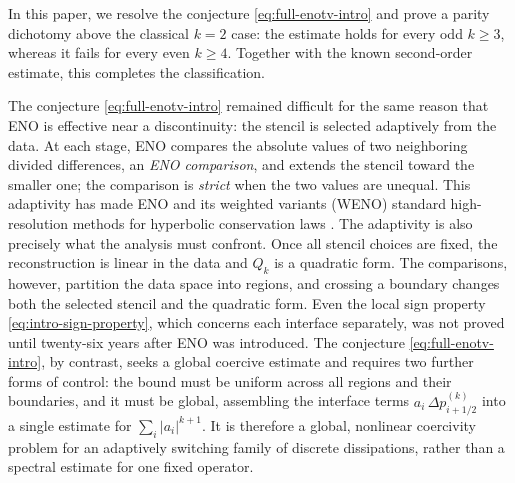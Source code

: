 \documentclass[11pt]{amsart}
\theoremstyle{plain}
\theoremstyle{definition}
\theoremstyle{remark}
\numberwithin{equation}{section}
\theoremstyle{plain}
\begin{document}
In this paper, we resolve the conjecture \eqref{eq:full-enotv-intro}
and prove a parity dichotomy above the classical $k=2$ case: the
estimate holds for every odd $k\ge3$, whereas it fails for every even
$k\ge4$.  Together with the known second-order estimate, this
completes the classification.


The conjecture \eqref{eq:full-enotv-intro} remained difficult for the same reason that ENO is
effective near a discontinuity: the stencil is selected adaptively
from the data.  At each stage, ENO compares the absolute values of two
neighboring divided differences, an \emph{ENO comparison}, and extends
the stencil toward the smaller one; the comparison is \emph{strict}
when the two values are unequal.  This adaptivity has made ENO and its
weighted variants (WENO) standard high-resolution methods for
hyperbolic conservation laws \cite{LiuOsherChan,JiangShu,Shu}. The adaptivity is
also precisely what the analysis must confront.  Once all stencil
choices are fixed, the reconstruction is linear in the data and $Q_k$
is a quadratic form.  The comparisons, however, partition the data
space into regions, and crossing a boundary changes both the selected
stencil and the quadratic form.  
Even the local sign property
\eqref{eq:intro-sign-property}, which concerns each interface
separately, was not proved until twenty-six years after ENO was
introduced.  The conjecture \eqref{eq:full-enotv-intro}, by contrast,
seeks a global coercive estimate and requires two further forms of
control: 
the bound must be uniform across all regions and their boundaries, and
it must be global, assembling the interface terms
$a_i\,\Delta p_{i+1/2}^{(k)}$ into a single estimate for
$\sum_i|a_i|^{k+1}$.  It is therefore a global, nonlinear coercivity
problem for an adaptively switching family of discrete dissipations,
rather than a spectral estimate for one fixed operator.
\end{document}
